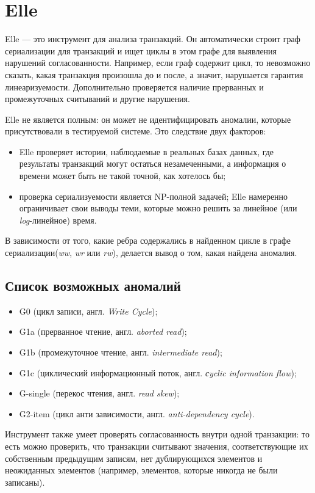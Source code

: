 \documentclass[14pt,  openany]{book}
\begin{document}
\section{Elle}
Elle --- это инструмент для анализа транзакций. Он автоматически строит граф сериализации для транзакций и ищет циклы в этом графе для выявления нарушений согласованности. Например, если граф содержит цикл, то невозможно сказать, какая транзакция произошла до и после, а значит, нарушается гарантия линеаризуемости.  
Дополнительно проверяется наличие прерванных и промежуточных считываний и другие нарушения.
\par Elle не является полным: он может не идентифицировать аномалии, которые присутствовали в тестируемой системе. Это следствие двух факторов:
\begin{itemize}
\item Elle проверяет истории, наблюдаемые в реальных базах данных, где результаты транзакций могут остаться незамеченными, а информация о времени может быть не такой точной, как хотелось бы;
\item проверка сериализуемости является NP-полной задачей; Elle намеренно ограничивает свои выводы теми, которые можно решить за линейное (или \textit{log}-линейное) время.
\end{itemize}
В зависимости от того, какие ребра содержались в найденном цикле в графе сериализации(\textit{ww}, \textit{wr} или \textit{rw}), делается вывод о том, какая найдена аномалия.
\subsection{Список возможных аномалий}
\begin{itemize}
\item G0 (цикл записи, англ. \textit{Write Cycle}); 
\item G1a (прерванное чтение, англ. \textit{aborted read});
\item G1b (промежуточное чтение, англ. \textit{intermediate read});
\item G1c (циклический информационный поток, англ. \textit{сyclic information flow});
\item G-single (перекос чтения, англ. \textit{read skew});
\item G2-item (цикл анти зависимости, англ.  \textit{anti-dependency cycle}).
\end{itemize}
\par Инструмент также умеет проверять согласованность внутри одной транзакции: то есть можно проверить, что транзакции считывают значения, соответствующие их собственным предыдущим записям, нет дублирующихся элементов и неожиданных элементов (например, элементов, которые никогда не были записаны).
\end{document}
